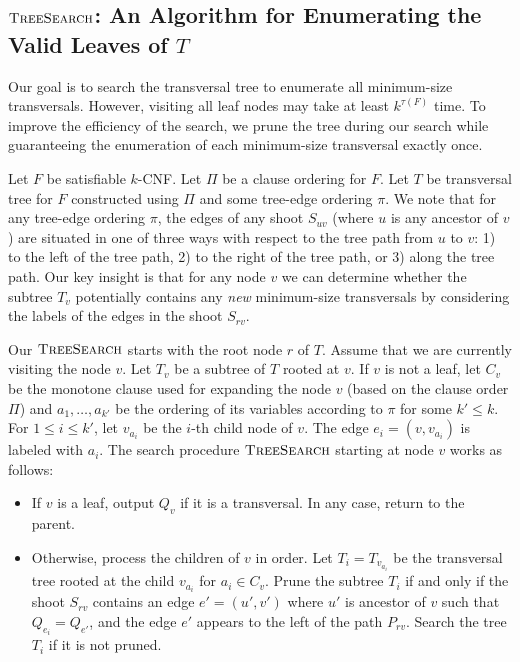 \documentclass[10pt,a4paper]{article}
\newtheorem{definition}{Definition}
\newcommand{\trn}{\tau}
\newcommand{\ts}{\textsc{TreeSearch}}
\begin{document}
\subsection{$\ts$: An Algorithm for Enumerating the Valid Leaves of $T$}

Our goal is to search the transversal tree to enumerate 
all minimum-size transversals. 
However, visiting 
all leaf nodes
may take at least $k^{\trn(F)}$ time. 
To improve the efficiency of the search,
we prune the tree during our search while
guaranteeing the enumeration of  
each minimum-size transversal exactly once.


Let $F$ be satisfiable $k$-CNF.
Let $\Pi$ be a clause ordering for $F$. Let $T$ be transversal
tree for $F$ constructed using $\Pi$ and some tree-edge ordering $\pi$. 
We note that for any tree-edge ordering $\pi$,
the edges of any 
shoot $S_{uv}$ (where $u$ is any ancestor of $v$)
are situated in one of three ways with respect to
the tree path from $u$ to $v$:
1) to the left of the tree path, 
2) to the right of the tree path, or
3) along the tree path.
Our key insight is that for any node $v$
we can determine 
whether the  subtree $T_v$ potentially contains 
any \emph{new }
minimum-size transversals by considering the labels of the edges
in the shoot $S_{rv}$.


Our $\ts$ starts with the root node $r$ of $T$.
Assume that we are currently visiting the node $v$.
Let $T_v$ be a subtree of $T$ rooted at $v$.
If $v$ is not a leaf, let $C_v$ be the monotone clause used for expanding
the node $v$ (based on the clause order $\Pi$) and   $a_1, \ldots, a_{k'}$ be the ordering of its variables
according to $\pi$ for some $k' \le k$. For $1\leq i \leq k'$, 
let $v_{a_i}$ be the $i$-th child node of $v$. The edge $e_i=(v,v_{a_i})$ is labeled with $a_i$.
The search procedure $\ts$ starting at node $v$ works as follows:

\begin{itemize}
\item  If $v$ is a leaf,
output $Q_v$ if it is a transversal.
In any case, return to the parent.
\item Otherwise, process the children of $v$ in order. 
Let $T_{i} = T_{v_{a_i}}$ be the transversal tree 
rooted at the child $v_{a_i}$ for $a_i \in C_v$. 
Prune the subtree $T_i$ if and only if 
the shoot $S_{rv}$ contains an edge $e'=(u',v')$ 
where $u'$ is ancestor of $v$ such that $Q_{e_i} = Q_{e'}$, and
the edge $e'$ appears to the left of the path $P_{rv}$.
Search the tree $T_i$ if it is not pruned.

\end{itemize}
\end{document}
